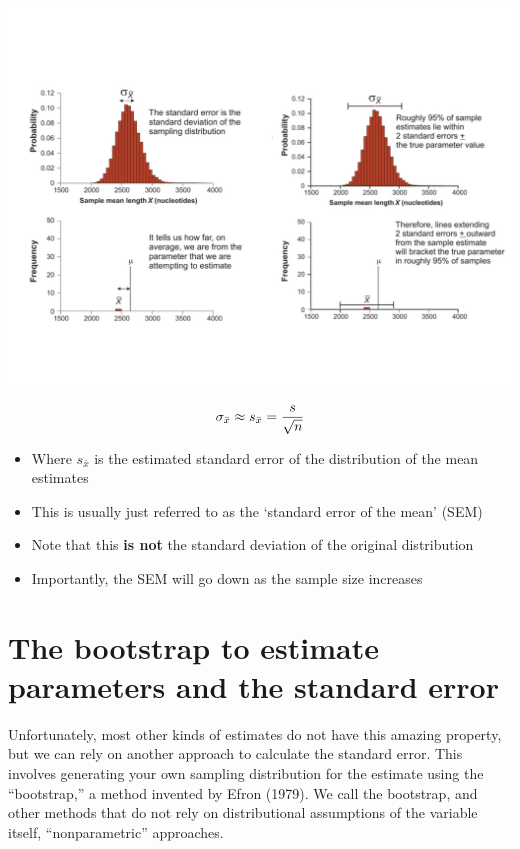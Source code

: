 \documentclass[]{book}
\providecommand{\tightlist}{%
  \setlength{\itemsep}{0pt}\setlength{\parskip}{0pt}}
\begin{document}
\begin{center}\includegraphics[width=1\linewidth]{images/week_2.028} \end{center}

\[\huge \sigma_{\bar{x}} \approx s_{\bar{x}} = \frac{s}{\sqrt{n}} \]

\begin{itemize}
\tightlist
\item
  Where \(s_{\bar{x}}\) is the estimated standard error of the distribution of the mean estimates
\item
  This is usually just referred to as the `standard error of the mean' (SEM)
\item
  Note that this \textbf{is not} the standard deviation of the original distribution
\item
  Importantly, the SEM will go down as the sample size increases
\end{itemize}

\hypertarget{the-bootstrap-to-estimate-parameters-and-the-standard-error}{%
\section{The bootstrap to estimate parameters and the standard error}\label{the-bootstrap-to-estimate-parameters-and-the-standard-error}}

Unfortunately, most other kinds of estimates do not have this amazing property, but we can rely on another approach to calculate the standard error. This involves generating your own sampling distribution for the estimate using the ``bootstrap,'' a method invented by Efron (1979). We call the bootstrap, and other methods that do not rely on distributional assumptions of the variable itself, ``nonparametric'' approaches.
\end{document}
